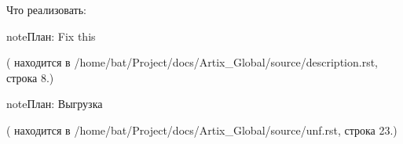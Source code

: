 \documentclass[twoside,11pt,a4paper,notitlepage]{report}
\begin{document}
\sphinxAtStartPar
Что реализовать:

\begin{sphinxadmonition}{note}{План:}
\sphinxAtStartPar
Fix this
\end{sphinxadmonition}

\sphinxAtStartPar
({\hyperref[\detokenize{description:id2}]{}} находится в /home/bat/Project/docs/Artix\_Global/source/description.rst, строка 8.)

\begin{sphinxadmonition}{note}{План:}
\sphinxAtStartPar
Выгрузка
\end{sphinxadmonition}

\sphinxAtStartPar
({\hyperref[\detokenize{unf:id2}]{}} находится в /home/bat/Project/docs/Artix\_Global/source/unf.rst, строка 23.)



\renewcommand{\indexname}{Алфавитный указатель}
\printindex
\end{document}
